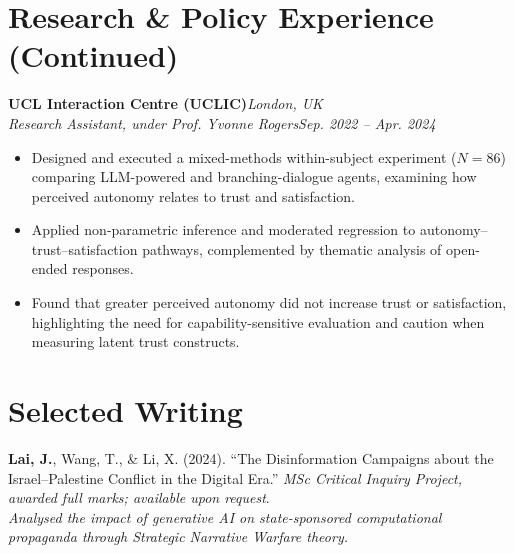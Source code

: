 \documentclass[11pt,a4paper]{article}
\newcommand{\cvheading}[4]{%
  \noindent\textbf{#1}\hfill\textit{#2}\\[-1pt]
  \textit{#3}\hfill\textit{#4}\\[-5pt]
}
\begin{document}
\section{Research \& Policy Experience (Continued)}
\cvheading{UCL Interaction Centre (UCLIC)}{London, UK}{Research Assistant, under Prof. Yvonne Rogers}{Sep. 2022 -- Apr. 2024}
\begin{itemize}
  \item Designed and executed a mixed-methods within-subject experiment ($N=86$) comparing LLM-powered and branching-dialogue agents, examining how perceived autonomy relates to trust and satisfaction.
  \item Applied non-parametric inference and moderated regression to autonomy--trust--satisfaction pathways, complemented by thematic analysis of open-ended responses.
  \item Found that greater perceived autonomy did not increase trust or satisfaction, highlighting the need for capability-sensitive evaluation and caution when measuring latent trust constructs.
\end{itemize}

\section{Selected Writing}
\textbf{Lai, J.}, Wang, T., \& Li, X. (2024). ``The Disinformation Campaigns about the Israel--Palestine Conflict in the Digital Era.'' \textit{MSc Critical Inquiry Project, awarded full marks; available upon request}.\\[-1pt]
\textit{Analysed the impact of generative AI on state-sponsored computational propaganda through Strategic Narrative Warfare theory.}
\end{document}
